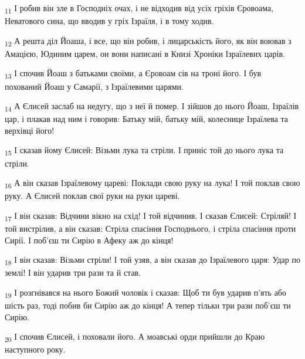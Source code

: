 \begin{tcolorbox}
\textsubscript{11} І робив він зле в Господніх очах, і не відходив від усіх гріхів Єровоама, Неватового сина, що вводив у гріх Ізраїля, і в тому ходив.
\end{tcolorbox}
\begin{tcolorbox}
\textsubscript{12} А решта діл Йоаша, і все, що він робив, і лицарськість його, як він воював з Амацією, Юдиним царем, он вони написані в Книзі Хроніки Ізраїлевих царів.
\end{tcolorbox}
\begin{tcolorbox}
\textsubscript{13} І спочив Йоаш з батьками своїми, а Єровоам сів на троні його. І був похований Йоаш у Самарії, з Ізраїлевими царями.
\end{tcolorbox}
\begin{tcolorbox}
\textsubscript{14} А Єлисей заслаб на недугу, що з неї й помер. І зійшов до нього Йоаш, Ізраїлів цар, і плакав над ним і говорив: Батьку мій, батьку мій, колеснице Ізраїлева та верхівці його!
\end{tcolorbox}
\begin{tcolorbox}
\textsubscript{15} І сказав йому Єлисей: Візьми лука та стріли. І приніс той до нього лука та стріли.
\end{tcolorbox}
\begin{tcolorbox}
\textsubscript{16} А він сказав Ізраїлевому цареві: Поклади свою руку на лука! І той поклав свою руку. А Єлисей поклав свої руки на руки цареві.
\end{tcolorbox}
\begin{tcolorbox}
\textsubscript{17} І він сказав: Відчини вікно на схід! І той відчинив. І сказав Єлисей: Стріляй! І той вистрілив, а він сказав: Стріла спасіння Господнього, і стріла спасіння проти Сирії. І поб'єш ти Сирію в Афеку аж до кінця!
\end{tcolorbox}
\begin{tcolorbox}
\textsubscript{18} І він сказав: Візьми стріли! І той узяв, а він сказав до Ізраїлевого царя: Удар по землі! І він ударив три рази та й став.
\end{tcolorbox}
\begin{tcolorbox}
\textsubscript{19} І розгнівався на нього Божий чоловік і сказав: Щоб ти був ударив п'ять або шість раз, тоді побив би Сирію аж до кінця! А тепер тільки три рази поб'єш ти Сирію.
\end{tcolorbox}
\begin{tcolorbox}
\textsubscript{20} І спочив Єлисей, і поховали його. А моавські орди прийшли до Краю наступного року.
\end{tcolorbox}
